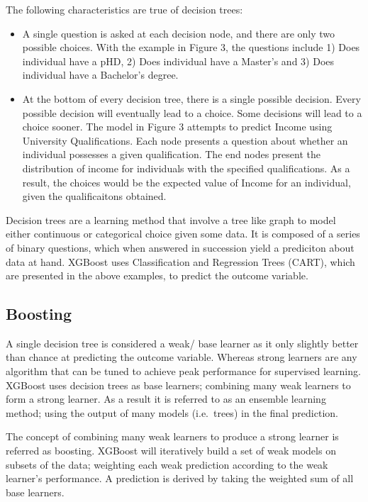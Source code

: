 \documentclass[]{book}
\providecommand{\tightlist}{%
  \setlength{\itemsep}{0pt}\setlength{\parskip}{0pt}}
\begin{document}
The following characteristics are true of decision trees:

\begin{itemize}
\tightlist
\item
  A single question is asked at each decision node, and there are only
  two possible choices. With the example in Figure 3, the questions
  include 1) Does individual have a pHD, 2) Does individual have a
  Master's and 3) Does individual have a Bachelor's degree.\\
\item
  At the bottom of every decision tree, there is a single possible
  decision. Every possible decision will eventually lead to a choice.
  Some decisions will lead to a choice sooner. The model in Figure 3
  attempts to predict Income using University Qualifications. Each node
  presents a question about whether an individual possesses a given
  qualification. The end nodes present the distribution of income for
  individuals with the specified qualifications. As a result, the
  choices would be the expected value of Income for an individual, given
  the qualificaitons obtained.
\end{itemize}

Decision trees are a learning method that involve a tree like graph to
model either continuous or categorical choice given some data. It is
composed of a series of binary questions, which when answered in
succession yield a prediciton about data at hand. XGBoost uses
Classification and Regression Trees (CART), which are presented in the
above examples, to predict the outcome variable.

\subsection{Boosting}\label{boosting}

A single decision tree is considered a weak/ base learner as it only
slightly better than chance at predicting the outcome variable. Whereas
strong learners are any algorithm that can be tuned to achieve peak
performance for supervised learning. XGBoost uses decision trees as base
learners; combining many weak learners to form a strong learner. As a
result it is referred to as an ensemble learning method; using the
output of many models (i.e.~trees) in the final prediction.

The concept of combining many weak learners to produce a strong learner
is referred as boosting. XGBoost will iteratively build a set of weak
models on subsets of the data; weighting each weak prediction according
to the weak learner's performance. A prediction is derived by taking the
weighted sum of all base learners.
\end{document}
